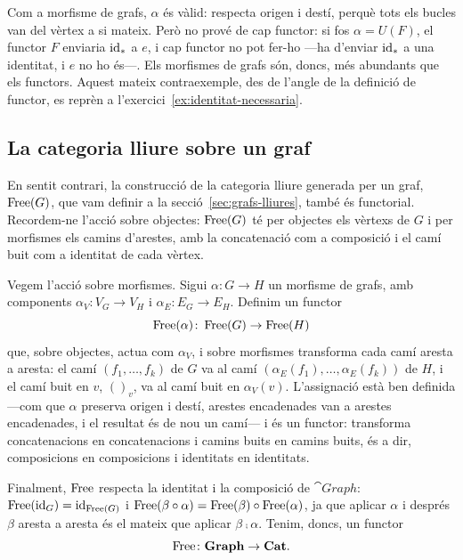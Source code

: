 Com a morfisme de grafs, $\alpha$ és vàlid: respecta origen i destí, perquè tots els bucles van del vèrtex a si mateix. Però no prové de cap functor: si fos $\alpha=U(F)$, el functor $F$ enviaria $\operatorname{id}_\ast$ a $e$, i cap functor no pot fer-ho ---ha d'enviar $\operatorname{id}_\ast$ a una identitat, i $e$ no ho és---. Els morfismes de grafs són, doncs, més abundants que els functors. Aquest mateix contraexemple, des de l'angle de la definició de functor, es reprèn a l'exercici~\ref{ex:identitat-necessaria}.

\subsection{La categoria lliure sobre un graf}

En sentit contrari, la construcció de la categoria lliure generada per un graf, $\operatorname{Free}(G)$, que vam definir a la secció~\ref{sec:grafs-lliures}, també és functorial. Recordem-ne l'acció sobre objectes: $\operatorname{Free}(G)$ té per objectes els vèrtexs de $G$ i per morfismes els camins d'arestes, amb la concatenació com a composició i el camí buit com a identitat de cada vèrtex.

Vegem l'acció sobre morfismes. Sigui $\alpha\colon G\to H$ un morfisme de grafs, amb components $\alpha_V\colon V_G\to V_H$ i $\alpha_E\colon E_G\to E_H$. Definim un functor
\[
\operatorname{Free}(\alpha)\colon\operatorname{Free}(G)\to\operatorname{Free}(H)
\]
que, sobre objectes, actua com $\alpha_V$, i sobre morfismes transforma cada camí aresta a aresta: el camí $(f_1,\dots,f_k)$ de $G$ va al camí $(\alpha_E(f_1),\dots,\alpha_E(f_k))$ de $H$, i el camí buit en $v$, $()_v$, va al camí buit en $\alpha_V(v)$. L'assignació està ben definida ---com que $\alpha$ preserva origen i destí, arestes encadenades van a arestes encadenades, i el resultat és de nou un camí--- i és un functor: transforma concatenacions en concatenacions i camins buits en camins buits, és a dir, composicions en composicions i identitats en identitats.

Finalment, $\operatorname{Free}$ respecta la identitat i la composició de $\cat{Graph}$: $\operatorname{Free}(\operatorname{id}_G)=\operatorname{id}_{\operatorname{Free}(G)}$ i $\operatorname{Free}(\beta\circ\alpha)=\operatorname{Free}(\beta)\circ\operatorname{Free}(\alpha)$, ja que aplicar $\alpha$ i després $\beta$ aresta a aresta és el mateix que aplicar $\beta\comp\alpha$. Tenim, doncs, un functor
\[
\operatorname{Free}\colon\mathbf{Graph}\to\mathbf{Cat}.
\]

